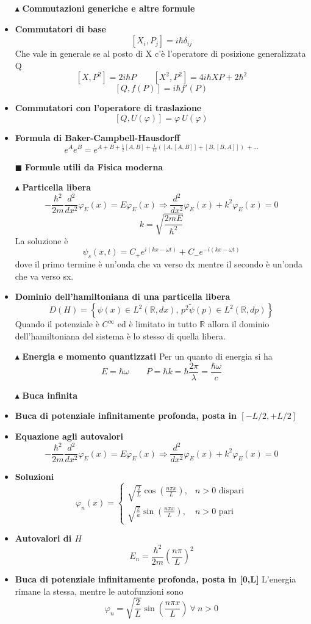 \documentclass{book}
\newcommand{\g}{\textbf}
\newcommand{\e}{\begin{equation}}
\newcommand{\ex}{\end{equation} }
\renewcommand{\it}{\item[$\cdot$]}
\begin{document}
\begin{multicols}{4}
\begin{itemize}
  
\item [$\blacktriangle$] \g{Commutazioni generiche e altre formule}
    \it \g{Commutatori di base}
        \e{[X_i, P_j] = i\hbar\delta_{ij}}\ex
        Che vale in generale se al posto di X c'è l'operatore di posizione generalizzata Q
        \e{[X, P^2] = 2i\hbar P \qquad [X^2, P^2] = 4i\hbar XP + 2\hbar^2} \ex
        \e{[Q,f(P)] = i \hbar f'(P)}\ex
    \it \g{Commutatori con l'operatore di traslazione}
    \e{[Q, U(\varphi)] = \varphi \ U(\varphi)}\ex
    \it \g{Formula di Baker-Campbell-Hausdorff}
    \e{e^{A}e^{B} = e^{A + B + \frac{1}{2}[A, B] + \frac{1}{12}\left([A,[A,B]] + [B,[B,A]]\right)\ + \dots} }\ex
    
\item[$\blacksquare$] \g{Formule utili da Fisica moderna}
\item [$\blacktriangle$] \g{Particella libera }
 \e{-\frac{\hbar^2}{2m} \frac{d^2}{dx^2} \varphi_E(x) = E \varphi_E(x) \Rightarrow 
            \frac{d^2}{dx^2} \varphi_E(x) + k^2 \varphi_E(x) = 0} \ex
            \e{k = \sqrt{\frac{2mE}{\hbar^{2}}}
            }\ex
            La soluzione è
            \e{\psi_{s}(x,t) = C_{+}e^{i(kx - \omega t)} + C_{-}e^{-i(kx - \omega t)}}\ex
            dove il primo termine è un'onda che va verso dx mentre il secondo è un'onda che va verso sx.
    \it \g{Dominio dell’hamiltoniana di una particella libera}
        \e{D(H) = \left\{ \psi(x) \in L^2(\mathbb{R}, dx), \, p^2 \tilde{\psi}(p) \in L^2(\mathbb{R}, dp) \right\}} \ex
    Quando il potenziale è $C^\infty$ ed è limitato in tutto $\mathbb{R}$ allora il dominio dell’hamiltoniana del sistema è lo stesso di quella libera.
\item [$\blacktriangle$] \g{Energia e momento quantizzati}
Per un quanto di energia si ha
\e{E = \hbar \omega \qquad P = \hbar k = \hbar \frac{2 \pi}{\lambda} = \frac{ \hbar \omega}{c}}\ex
\item [$\blacktriangle$] \g{Buca infinita}
    \it \g{Buca di potenziale infinitamente profonda, posta in $[-L/2, +L/2]$}
        \it \g{Equazione agli autovalori}
            \e{-\frac{\hbar^2}{2m} \frac{d^2}{dx^2} \varphi_E(x) = E \varphi_E(x) \Rightarrow 
            \frac{d^2}{dx^2} \varphi_E(x) + k^2 \varphi_E(x) = 0} \ex
        \it \g{Soluzioni}
            \e{\varphi_n(x) = 
            \begin{cases} 
                \sqrt{\frac{2}{L}} \cos\left(\frac{n\pi x}{L}\right), & n > 0 \text{ dispari} \\
                \sqrt{\frac{2}{a}} \sin\left(\frac{n\pi x}{L}\right), & n > 0 \text{ pari}
            \end{cases}} \ex
        \it \g{Autovalori di $H$}
            \e{E_n = \frac{\hbar^2}{2m} \left(\frac{n\pi}{L}\right)^2} \ex
    \it \g{Buca di potenziale infinitamente profonda, posta in [0,L]}
    L'energia rimane la stessa, mentre le autofunzioni sono
    \e{\varphi_{n} = \sqrt{\frac{2}{L}}\sin(\frac{n \pi x}{L}) \ \forall \ n > 0}\ex
    

\end{itemize}
\end{multicols}
\end{document}

